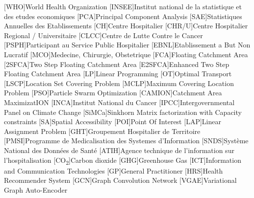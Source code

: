 \begin{multicols}{2}

        \begin{acronym}
                [WHO]{World Health Organization}
                [INSEE]{Institut national de la statistique et des etudes economiques}
                [PCA]{Principal Component Analysis}
                [SAE]{Statistiques Annuelles des Etablissements}
                [CH]{Centre Hospitalier}
                [CHR/U]{Centre Hospitalier Regional / Universitaire}
                [CLCC]{Centre de Lutte Contre le Cancer}
                [PSPH]{Participant au Service Public Hospitalier }
                [EBNL]{Etablissement a But Non Lucratif}
                [MCO]{Medecine, Chirurgie, Obstetrique}
                [FCA]{Floating Catchment Area}
                [2SFCA]{Two Step Floating Catchment Area}
                [E2SFCA]{Enhanced Two Step Floating Catchment Area}
                [LP]{Linear Programming}
                [OT]{Optimal Transport}
                [LSCP]{Location Set Covering Problem}
                [MCLP]{Maximum Covering Location Problem}
                [PSO]{Particle Swarm Optimization}
                [CAMION]{Catchment Area MaximizatION}
                [INCA]{Institut National du Cancer}
                [IPCC]{Intergovernmental Panel on Climate Change}
                [SiMCa]{Sinkhorn Matrix factorization with Capacity constraints}
                [SA]{Spatial Accessibility}
                [POI]{Point Of Interest}
                [LAP]{Linear Assignment Problem}
                [GHT]{Groupement Hospitalier de Territoire}
                [PMSI]{Programme de Medicalisation des Systemes d'Information}
                [SNDS]{Système National des Données de Santé}
                [ATIH]{Agence technique de l'information sur l'hospitalisation}
                [CO\textsubscript{2}]{Carbon dioxide}
                [GHG]{Greenhouse Gas}
                [ICT]{Information and Communication Technologies}
                [GP]{General Practitioner}
                [HRS]{Health Recommender System}
                [GCN]{Graph Convolution Network}
                [VGAE]{Variational Graph Auto-Encoder}
        \end{acronym}

\end{multicols}
